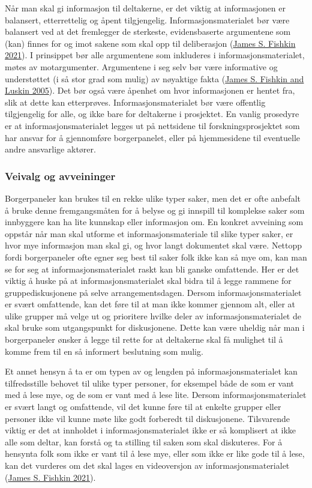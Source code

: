 \documentclass[
  12pt,
  a4paper, 12pt]{article}
\begin{document}
Når man skal gi informasjon til deltakerne, er det viktig at informasjonen er balansert, etterrettelig og åpent tilgjengelig. Informasjonsmaterialet bør være balansert ved at det fremlegger de sterkeste, evidensbaserte argumentene som (kan) finnes for og imot sakene som skal opp til deliberasjon (\protect\hyperlink{ref-fishkin2021deliberative}{James S. Fishkin 2021}). I prinsippet bør alle argumentene som inkluderes i informasjonsmaterialet, møtes av motargumenter. Argumentene i seg selv bør være informative og understøttet (i så stor grad som mulig) av nøyaktige fakta (\protect\hyperlink{ref-fishkin2005experimenting}{James S. Fishkin and Luskin 2005}). Det bør også være åpenhet om hvor informasjonen er hentet fra, slik at dette kan etterprøves. Informasjonsmaterialet bør være offentlig tilgjengelig for alle, og ikke bare for deltakerne i prosjektet. En vanlig prosedyre er at informasjonsmaterialet legges ut på nettsidene til forskningsprosjektet som har ansvar for å gjennomføre borgerpanelet, eller på hjemmesidene til eventuelle andre ansvarlige aktører.

\hypertarget{veivalg-og-avveininger}{%
\subsubsection{Veivalg og avveininger}\label{veivalg-og-avveininger}}

Borgerpaneler kan brukes til en rekke ulike typer saker, men det er ofte anbefalt å bruke denne fremgangsmåten for å belyse og gi innspill til komplekse saker som innbyggere kan ha lite kunnskap eller informasjon om. En konkret avveining som oppstår når man skal utforme et informasjonsmateriale til slike typer saker, er hvor mye informasjon man skal gi, og hvor langt dokumentet skal være. Nettopp fordi borgerpaneler ofte egner seg best til saker folk ikke kan så mye om, kan man se for seg at informasjonsmaterialet raskt kan bli ganske omfattende. Her er det viktig å huske på at informasjonsmaterialet skal bidra til å legge rammene for gruppediskusjonene på selve arrangementsdagen. Dersom informasjonsmaterialet er svært omfattende, kan det føre til at man ikke kommer gjennom alt, eller at ulike grupper må velge ut og prioritere hvilke deler av informasjonsmaterialet de skal bruke som utgangspunkt for diskusjonene. Dette kan være uheldig når man i borgerpaneler ønsker å legge til rette for at deltakerne skal få mulighet til å komme frem til en så informert beslutning som mulig.

Et annet hensyn å ta er om typen av og lengden på informasjonsmaterialet kan tilfredsstille behovet til ulike typer personer, for eksempel både de som er vant med å lese mye, og de som er vant med å lese lite. Dersom informasjonsmaterialet er svært langt og omfattende, vil det kunne føre til at enkelte grupper eller personer ikke vil kunne møte like godt forberedt til diskusjonene. Tilsvarende viktig er det at innholdet i informasjonsmaterialet ikke er så komplisert at ikke alle som deltar, kan forstå og ta stilling til saken som skal diskuteres. For å hensynta folk som ikke er vant til å lese mye, eller som ikke er like gode til å lese, kan det vurderes om det skal lages en videoversjon av informasjonsmaterialet (\protect\hyperlink{ref-fishkin2021deliberative}{James S. Fishkin 2021}).
\end{document}
